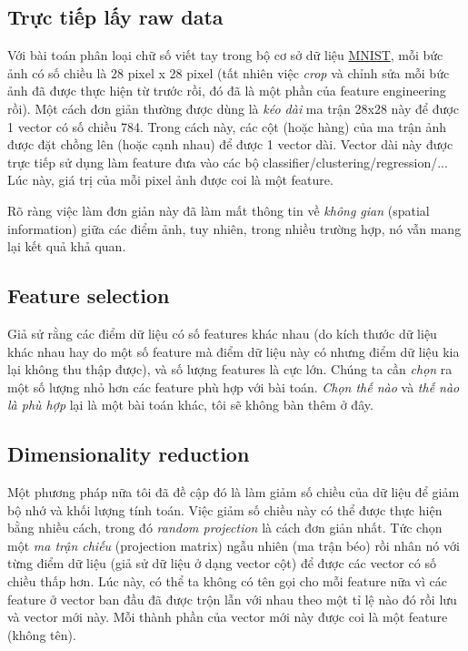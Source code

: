 \subsection{Trực tiếp lấy raw data }
Với bài toán phân loại chữ số viết tay trong bộ cơ sở dữ liệu \href{http://machinelearningcoban.com/2017/01/04/kmeans2/#bo-co-so-du-lieu-mnist}{MNIST}, mỗi bức ảnh có số chiều là 28 pixel x 28 pixel (tất nhiên việc \textit{crop} và chỉnh sửa mỗi bức ảnh đã được thực hiện từ trước rồi, đó đã là một phần của feature engineering rồi). Một cách đơn giản thường được dùng là \textit{kéo dài} ma trận 28x28 này để được 1 vector có số chiều 784. Trong cách này, các cột (hoặc hàng) của ma trận ảnh được đặt chồng lên (hoặc cạnh nhau) để được 1 vector dài. Vector dài này được trực tiếp sử dụng làm feature đưa vào các bộ classifier/clustering/regression/... Lúc này, giá trị của mỗi pixel ảnh được coi là một feature.  
 
Rõ ràng việc làm đơn giản này đã làm mất thông tin về \textit{không gian} (spatial information) giữa các điểm ảnh, tuy nhiên, trong nhiều trường hợp, nó vẫn mang lại kết quả khả quan.  
 
\subsection{Feature selection }
Giả sử rằng các điểm dữ liệu có số features khác nhau (do kích thước dữ liệu khác nhau hay do một số feature mà điểm dữ liệu này có nhưng điểm dữ liệu kia lại không thu thập được), và số lượng features là cực lớn. Chúng ta cần \textit{chọn} ra một số lượng nhỏ hơn các feature phù hợp với bài toán. \textit{Chọn thế nào} và \textit{thế nào là phù hợp} lại là một bài toán khác, tôi sẽ không bàn thêm ở đây. 
 
 
\subsection{Dimensionality reduction }
Một phương pháp nữa tôi đã đề cập đó là làm giảm số chiều của dữ liệu để giảm bộ nhớ và khối lượng tính toán. Việc giảm số chiều này có thể được thực hiện bằng nhiều cách, trong đó \textit{random projection} là cách đơn giản nhất. Tức chọn một \textit{ma trận chiếu} (projection matrix) ngẫu nhiên (ma trận béo) rồi nhân nó với từng điểm dữ liệu (giả sử dữ liệu ở dạng vector cột) để được các vector có số chiều thấp hơn. Lúc này, có thể ta không có tên gọi cho mỗi feature nữa vì các feature ở vector ban đầu đã được trộn lẫn với nhau theo một tỉ lệ nào đó rồi lưu và vector mới này. Mỗi thành phần của vector mới này được coi là một feature (không tên).  
 
